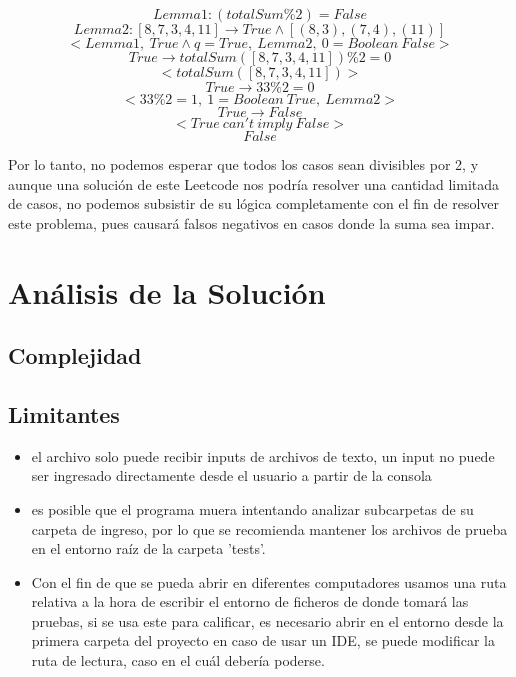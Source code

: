 \documentclass[a4paper]{article}
\begin{document}
    $$Lemma 1: (totalSum\%2) = False $$
    $$Lemma 2: [8, 7, 3, 4, 11] \rightarrow True \land [(8,3),(7,4),(11)] $$
    $$< Lemma 1, \ True \land q = True, \ Lemma 2, \ 0 = Boolean \ False >$$ 
    $$  True \rightarrow totalSum([8, 7, 3, 4, 11])\%2 = 0$$
    $$<totalSum([8, 7, 3, 4, 11])>$$ 
    $$True \rightarrow 33\%2 = 0$$
    $$<33\%2 = 1 , \ 1 = Boolean \ True, \ Lemma 2>$$ 
    $$True \rightarrow False$$
    $$<True \ can't \ imply \ False>$$
    $$False$$

Por lo tanto, no podemos esperar que todos los casos sean divisibles por 2, y aunque
una solución de este Leetcode nos podría resolver una cantidad limitada de casos, no podemos
subsistir de su lógica completamente con el fin de resolver este problema, pues causará 
falsos negativos en casos donde la suma sea impar.


\section{Análisis de la Solución}

\subsection{Complejidad}

\subsection{Limitantes}
    \begin{itemize}
        \item el archivo solo puede recibir inputs de archivos de texto, un input no
        puede ser ingresado directamente desde el usuario a partir de la consola
        \item es posible que el programa muera intentando analizar subcarpetas de su carpeta
        de ingreso, por lo que se recomienda mantener los archivos de prueba en el entorno
        raíz de la carpeta 'tests'.
        \item Con el fin de que se pueda abrir en diferentes computadores usamos una ruta relativa
        a la hora de escribir el entorno de ficheros de donde tomará las pruebas, si se usa este 
        para calificar, es necesario abrir en el entorno desde la primera carpeta del proyecto en
        caso de usar un IDE, se puede modificar la ruta de lectura, caso en el cuál debería poderse. 
    \end{itemize}
\end{document}
